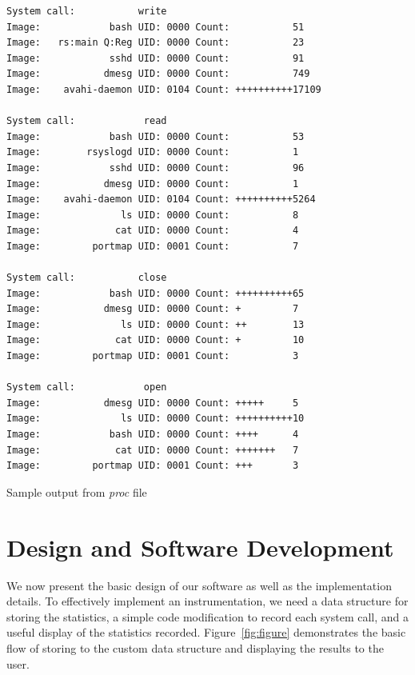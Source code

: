 \documentclass[conference]{IEEEtran}
\begin{document}
\begin{algorithm*}[t!]
\begin{verbatim}
System call:           write
Image:            bash UID: 0000 Count:           51
Image:   rs:main Q:Reg UID: 0000 Count:           23
Image:            sshd UID: 0000 Count:           91
Image:           dmesg UID: 0000 Count:           749
Image:    avahi-daemon UID: 0104 Count: ++++++++++17109

System call:            read
Image:            bash UID: 0000 Count:           53
Image:        rsyslogd UID: 0000 Count:           1
Image:            sshd UID: 0000 Count:           96
Image:           dmesg UID: 0000 Count:           1
Image:    avahi-daemon UID: 0104 Count: ++++++++++5264
Image:              ls UID: 0000 Count:           8
Image:             cat UID: 0000 Count:           4
Image:         portmap UID: 0001 Count:           7

System call:           close
Image:            bash UID: 0000 Count: ++++++++++65
Image:           dmesg UID: 0000 Count: +         7
Image:              ls UID: 0000 Count: ++        13
Image:             cat UID: 0000 Count: +         10
Image:         portmap UID: 0001 Count:           3

System call:            open
Image:           dmesg UID: 0000 Count: +++++     5
Image:              ls UID: 0000 Count: ++++++++++10
Image:            bash UID: 0000 Count: ++++      4
Image:             cat UID: 0000 Count: +++++++   7
Image:         portmap UID: 0001 Count: +++       3
\end{verbatim}
\caption{Sample output from \textit{proc} file}
\end{algorithm*}

\section{Design and Software Development}
\label{sec:design}
We now present the basic design of our software as well as the implementation details.
To effectively implement an instrumentation, we need a data structure for storing the statistics, a simple code modification to record each system call, and a useful display of the statistics recorded.
Figure~\ref{fig:figure} demonstrates the basic flow of storing to the custom data structure and displaying the results to the user.
\end{document}
